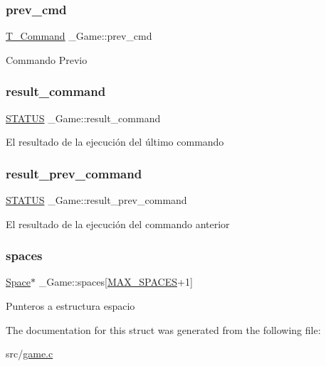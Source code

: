 \subsubsection{\texorpdfstring{prev\+\_\+cmd}{prev\_cmd}}
{\footnotesize\ttfamily \hyperlink{command_8h_a0473597db8c45c0289b6b8e2f8abbe32}{T\+\_\+\+Command} \+\_\+\+Game\+::prev\+\_\+cmd}

Commando Previo \mbox{\label{struct__Game_ab6b04f339d8c214112366e3207164ebb}} 
\subsubsection{\texorpdfstring{result\+\_\+command}{result\_command}}
{\footnotesize\ttfamily \hyperlink{types_8h_a32c27cc471df37f4fc818d65de0a56c4}{S\+T\+A\+T\+US} \+\_\+\+Game\+::result\+\_\+command}

El resultado de la ejecución del último commando \mbox{\label{struct__Game_a9b1ff5315a1aeb3b0c66007da129f57a}} 
\subsubsection{\texorpdfstring{result\+\_\+prev\+\_\+command}{result\_prev\_command}}
{\footnotesize\ttfamily \hyperlink{types_8h_a32c27cc471df37f4fc818d65de0a56c4}{S\+T\+A\+T\+US} \+\_\+\+Game\+::result\+\_\+prev\+\_\+command}

El resultado de la ejecución del commando anterior \mbox{\label{struct__Game_ab4180417d9148f8abb2233ca6c4ecfe5}} 
\subsubsection{\texorpdfstring{spaces}{spaces}}
{\footnotesize\ttfamily \hyperlink{space_8h_a67533ffc2b70463baecc38fb0629bbfc}{Space}$\ast$ \+\_\+\+Game\+::spaces\mbox{[}\hyperlink{space_8h_a5f54fd55f983a2e33ce076cd9f587e82}{M\+A\+X\+\_\+\+S\+P\+A\+C\+ES}+1\mbox{]}}

Punteros a estructura espacio 

The documentation for this struct was generated from the following file\+:\begin{DoxyCompactItemize}
\item 
src/\hyperlink{game_8c}{game.\+c}\end{DoxyCompactItemize}
